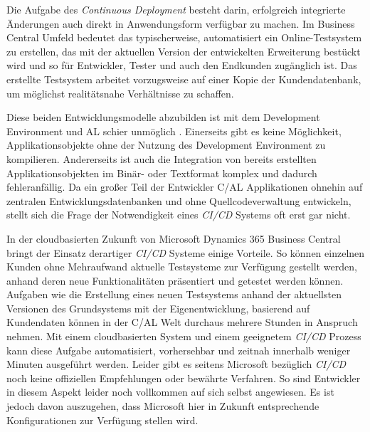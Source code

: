 Die Aufgabe des \textit{Continuous Deployment} besteht darin, erfolgreich integrierte Änderungen auch direkt in Anwendungsform verfügbar zu machen. Im Business Central Umfeld bedeutet das typischerweise, automatisiert ein Online-Testsystem zu erstellen, das mit der aktuellen Version der entwickelten Erweiterung bestückt wird und so für Entwickler, Tester und auch den Endkunden zugänglich ist. Das erstellte Testsystem arbeitet vorzugsweise auf einer Kopie der Kundendatenbank, um möglichst realitätsnahe Verhältnisse zu schaffen.

Diese beiden Entwicklungsmodelle abzubilden ist mit dem Development Environment und AL schier unmöglich \cite{waldo2019}. Einerseits gibt es keine Möglichkeit, Applikationsobjekte ohne der Nutzung des Development Environment zu kompilieren. Andererseits ist auch die Integration von bereits erstellten Applikationsobjekten im Binär- oder Textformat komplex und dadurch fehleranfällig. Da ein großer Teil der Entwickler C/AL Applikationen ohnehin auf zentralen Entwicklungsdatenbanken und ohne Quellcodeverwaltung entwickeln, stellt sich die Frage der Notwendigkeit eines \textit{CI/CD} Systems oft erst gar nicht. 

In der cloudbasierten Zukunft von Microsoft Dynamics 365 Business Central bringt der Einsatz derartiger \textit{CI/CD} Systeme einige Vorteile. So können einzelnen Kunden ohne Mehraufwand aktuelle Testsysteme zur Verfügung gestellt werden, anhand deren neue Funktionalitäten präsentiert und getestet werden können. Aufgaben wie die Erstellung eines neuen Testsystems anhand der aktuellsten Versionen des Grundsystems mit der Eigenentwicklung, basierend auf Kundendaten können in der C/AL Welt durchaus mehrere Stunden in Anspruch nehmen. Mit einem cloudbasierten System und einem geeignetem \textit{CI/CD} Prozess kann diese Aufgabe automatisiert, vorhersehbar und zeitnah innerhalb weniger Minuten ausgeführt werden. Leider gibt es seitens Microsoft bezüglich \textit{CI/CD} noch keine offiziellen Empfehlungen oder bewährte Verfahren. So sind Entwickler in diesem Aspekt leider noch vollkommen auf sich selbst angewiesen. Es ist jedoch davon auszugehen, dass Microsoft hier in Zukunft entsprechende Konfigurationen zur Verfügung stellen wird. 





